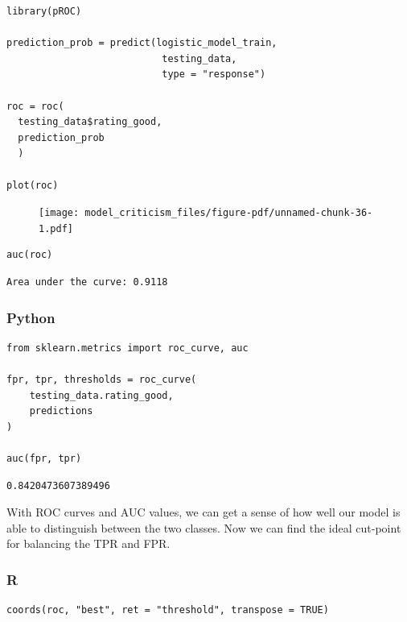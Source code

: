 \documentclass[
  letterpaper,
]{krantz}
\begin{document}
\begin{verbatim}
library(pROC)

prediction_prob = predict(logistic_model_train, 
                           testing_data, 
                           type = "response")

roc = roc(
  testing_data$rating_good, 
  prediction_prob
  )

plot(roc)
\end{verbatim}

\begin{figure}[H]

{\centering \texttt{[image: model\_criticism\_files/figure-pdf/unnamed-chunk-36-1.pdf]}

}

\end{figure}

\begin{verbatim}
auc(roc)
\end{verbatim}

\begin{verbatim}
Area under the curve: 0.9118
\end{verbatim}

\subsubsection{Python}

\begin{verbatim}
from sklearn.metrics import roc_curve, auc

fpr, tpr, thresholds = roc_curve(
    testing_data.rating_good, 
    predictions
)

auc(fpr, tpr)
\end{verbatim}

\begin{verbatim}
0.8420473607389496
\end{verbatim}

With ROC curves and AUC values, we can get a sense of how well our model
is able to distinguish between the two classes. Now we can find the
ideal cut-point for balancing the TPR and FPR.

\subsubsection{R}

\begin{verbatim}
coords(roc, "best", ret = "threshold", transpose = TRUE)
\end{verbatim}
\end{document}
